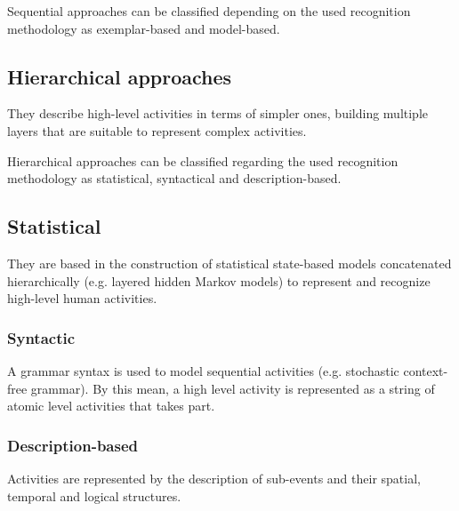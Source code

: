\documentclass[a4paper, 12pt, openany, oneside]{book}
\begin{document}
Sequential approaches can be classified depending on the used recognition methodology as exemplar-based and model-based.


\subsection{Hierarchical approaches}
They describe high-level activities in terms of simpler ones, building multiple layers that are suitable to represent complex activities.

Hierarchical approaches can be classified regarding the used recognition methodology as statistical, syntactical and description-based.

\subsection{Statistical}
They are based in the construction of statistical state-based models concatenated hierarchically (e.g. layered hidden Markov models) to represent and recognize high-level human activities.

\subsubsection{Syntactic}
A grammar syntax is used to model sequential activities (e.g. stochastic context-free grammar). 
By this mean, a high level activity is represented as a string of atomic level activities that takes part.

\subsubsection{Description-based}
Activities are represented by the description of sub-events and their spatial, temporal and logical structures.




\end{document}
